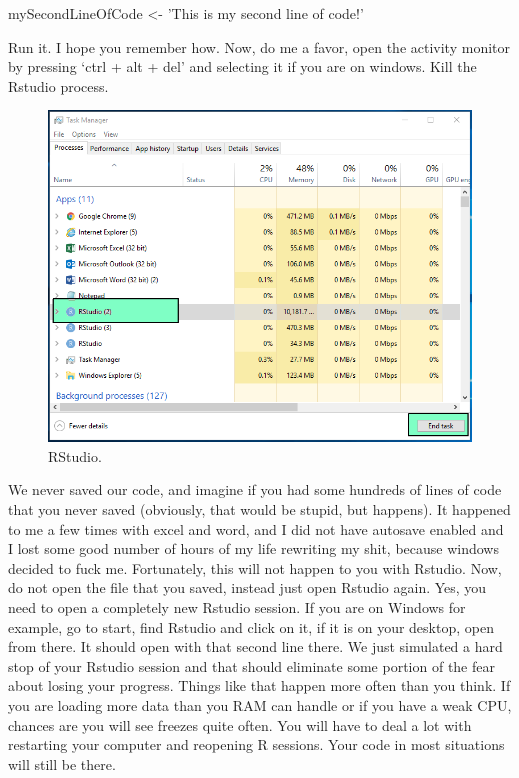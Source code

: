 \documentclass[]{book}
\newenvironment{Shaded}{\begin{snugshade}}{\end{snugshade}}
\newcommand{\NormalTok}[1]{#1}
\newcommand{\StringTok}[1]{\textcolor[rgb]{0.31,0.60,0.02}{#1}}
\begin{document}
\begin{Shaded}
\begin{Highlighting}[]
\NormalTok{mySecondLineOfCode <-}\StringTok{ 'This is my second line of code!'}
\end{Highlighting}
\end{Shaded}

Run it. I hope you remember how. Now, do me a favor, open the activity monitor by pressing `ctrl + alt + del' and selecting it if you are on windows. Kill the Rstudio process.

\begin{figure}
\centering
\includegraphics{rstudio8.png}
\caption{RStudio.}
\end{figure}

We never saved our code, and imagine if you had some hundreds of lines of code that you never saved (obviously, that would be stupid, but happens). It happened to me a few times with excel and word, and I did not have autosave enabled and I lost some good number of hours of my life rewriting my shit, because windows decided to fuck me. Fortunately, this will not happen to you with Rstudio. Now, do not open the file that you saved, instead just open Rstudio again. Yes, you need to open a completely new Rstudio session. If you are on Windows for example, go to start, find Rstudio and click on it, if it is on your desktop, open from there. It should open with that second line there. We just simulated a hard stop of your Rstudio session and that should eliminate some portion of the fear about losing your progress. Things like that happen more often than you think. If you are loading more data than you RAM can handle or if you have a weak CPU, chances are you will see freezes quite often. You will have to deal a lot with restarting your computer and reopening R sessions. Your code in most situations will still be there.
\end{document}
